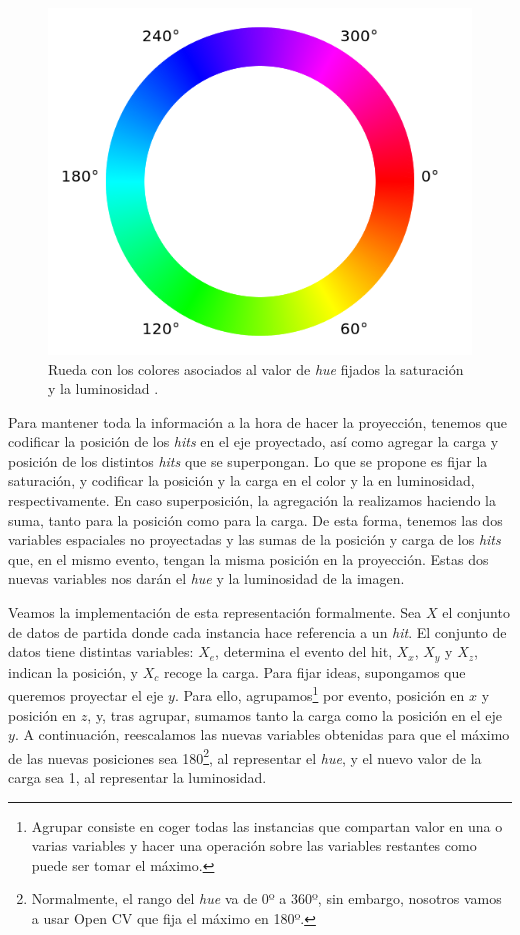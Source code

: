 \documentclass[a4paper,12pt,oneside,titlepage]{book}
\begin{document}
\begin{figure}[h!]
  \centering
  \includegraphics[scale=0.45]{h-colours.png}
  \caption{Rueda con los colores asociados al valor de \textit{hue} fijados la saturación y la luminosidad \cite{hue_page}.}
  \label{fig:hue}
\end{figure}

Para mantener toda la información a la hora de hacer la proyección, tenemos que codificar la posición de los \textit{hits} en el eje proyectado, así como agregar la carga y posición de los distintos \textit{hits} que se superpongan. Lo que se propone es fijar la saturación, y codificar la posición y la carga en el color y la en luminosidad, respectivamente. En caso superposición, la agregación la realizamos haciendo la suma, tanto para la posición como para la carga. De esta forma, tenemos las dos variables espaciales no proyectadas y las sumas de la posición y carga de los \textit{hits} que, en el mismo evento, tengan la misma posición en la proyección. Estas dos nuevas variables nos darán el \textit{hue} y la luminosidad de la imagen.

Veamos la implementación de esta representación formalmente. Sea $X$ el conjunto de datos de partida donde cada instancia hace referencia a un \textit{hit}. El conjunto de datos tiene distintas variables: $X_e$, determina el evento del hit, $X_x$, $X_y$ y $X_z$, indican la posición, y $X_c$ recoge la carga. Para fijar ideas, supongamos que queremos proyectar el eje $y$. Para ello, agrupamos\footnote{Agrupar consiste en coger todas las instancias que compartan valor en una o varias variables y hacer una operación sobre las variables restantes como puede ser tomar el máximo.} por evento, posición en $x$ y posición en $z$, y, tras agrupar, sumamos tanto la carga como la posición en el eje $y$. A continuación, reescalamos las nuevas variables obtenidas para que el máximo de las nuevas posiciones sea 180\footnote{Normalmente, el rango del \textit{hue} va de 0º a 360º, sin embargo, nosotros vamos a usar Open CV que fija el máximo en 180º.}, al representar el \textit{hue}, y el nuevo valor de la carga sea 1, al representar la luminosidad.
\end{document}
